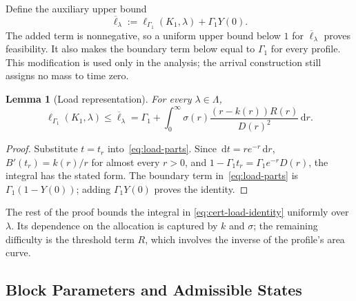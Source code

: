 \documentclass[11pt]{article}
\newtheorem{lemma}[theorem]{Lemma}
\theoremstyle{definition}
\theoremstyle{remark}
\newcommand{\dd}{\,\mathrm d}
\begin{document}
Define the auxiliary upper bound
\begin{equation}\label{eq:cert-augmented-load}
 \overline\ell_\lambda
 :=\ell_{\Gamma_1}(K_1,\lambda)+\Gamma_1Y(0).
\end{equation}
The added term is nonnegative, so a uniform upper bound below $1$ for
$\overline\ell_\lambda$ proves feasibility.  It also makes the boundary
term below equal to $\Gamma_1$ for every profile.  This modification is
used only in the analysis; the arrival construction still assigns no
mass to time zero.

\begin{lemma}[Load representation]\label{lem:cert-load-identity}
For every $\lambda\in\Lambda$,
\begin{equation}\label{eq:cert-load-identity}
 \ell_{\Gamma_1}(K_1,\lambda)\le\overline\ell_\lambda
 =\Gamma_1+\int_0^\infty
 \sigma(r)\frac{(r-k(r))R(r)}{D(r)^2}\dd r.
\end{equation}
\end{lemma}
\begin{proof}
Substitute $t=t_r$ into~\eqref{eq:load-parts}.
Since $\dd t=re^{-r}\dd r$,
$B'(t_r)=k(r)/r$ for almost every $r>0$, and
$1-\Gamma_1t_r=\Gamma_1e^{-r}D(r)$, the integral has the stated form.
The boundary term in~\eqref{eq:load-parts} is
$\Gamma_1(1-Y(0))$; adding $\Gamma_1Y(0)$ proves the identity.
\end{proof}

The rest of the proof bounds the integral in
\eqref{eq:cert-load-identity} uniformly over $\lambda$.
Its dependence on the allocation is captured by $k$ and $\sigma$;
the remaining difficulty is the threshold term $R$, which involves
the inverse of the profile's area curve.

\subsection{Block Parameters and Admissible States}\label{sec:cert-finite}
\end{document}
